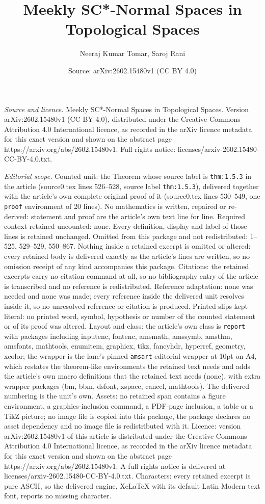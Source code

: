 \documentclass[10pt,a4paper]{amsart}
\title[Meekly SC*-Normal Spaces in Topological Spaces]{Meekly SC*-Normal Spaces in Topological Spaces}
\author{Neeraj Kumar Tomar, Saroj Rani}
\date{Source: arXiv:2602.15480v1 (CC BY 4.0)}
\begin{document}
\maketitle

\noindent\emph{Source and licence.} Meekly SC*-Normal Spaces in Topological Spaces. Version arXiv:2602.15480v1 (CC BY 4.0), distributed under the Creative Commons Attribution 4.0 International licence, as recorded in the arXiv licence metadata for this exact version and shown on the abstract page https://arxiv.org/abs/2602.15480v1. Full rights notice: licenses/arxiv-2602.15480-CC-BY-4.0.txt.\par\smallskip

\noindent\textit{Editorial scope.} Counted unit: the Theorem whose source label is \texttt{thm:1.5.3} in the article (source0.tex lines 526--528, source label \texttt{thm:1.5.3}), delivered together with the article's own complete original proof of it (source0.tex lines 530--549, one \texttt{proof} environment of 20 lines). No mathematics is written, repaired or re-derived: statement and proof are the article's own text line for line. Required context retained uncounted: none. Every definition, display and label of those lines is retained unchanged. Omitted from this package and not redistributed: 1--525, 529--529, 550--867. Nothing inside a retained excerpt is omitted or altered: every retained body is delivered exactly as the article's lines are written, so no omission receipt of any kind accompanies this package. Citations: the retained excerpts carry no citation command at all, so no bibliography entry of the article is transcribed and no reference is redistributed. Reference adaptation: none was needed and none was made; every reference inside the delivered unit resolves inside it, so no unresolved reference or citation is produced. Printed slips kept literal: no printed word, symbol, hypothesis or number of the counted statement or of its proof was altered. Layout and class: the article's own class is \texttt{report} with packages including inputenc, fontenc, amsmath, amssymb, amsthm, amsfonts, mathtools, enumitem, graphicx, tikz, fancyhdr, hyperref, geometry, xcolor; the wrapper is the lane's pinned \texttt{amsart} editorial wrapper at 10pt on A4, which restates the theorem-like environments the retained text needs and adds the article's own macro definitions that the retained text needs (none), with extra wrapper packages (bm, bbm, dsfont, xspace, cancel, mathtools). The delivered numbering is the unit's own. Assets: no retained span contains a figure environment, a graphics-inclusion command, a PDF-page inclusion, a table or a TikZ picture; no image file is copied into this package, the package declares no asset dependency and no image file is redistributed with it. Licence: version arXiv:2602.15480v1 of this article is distributed under the Creative Commons Attribution 4.0 International licence, as recorded in the arXiv licence metadata for this exact version and shown on the abstract page https://arxiv.org/abs/2602.15480v1. A full rights notice is delivered at licenses/arxiv-2602.15480-CC-BY-4.0.txt. Characters: every retained excerpt is pure ASCII, so the delivered engine, XeLaTeX with its default Latin Modern text font, reports no missing character.
\end{document}
